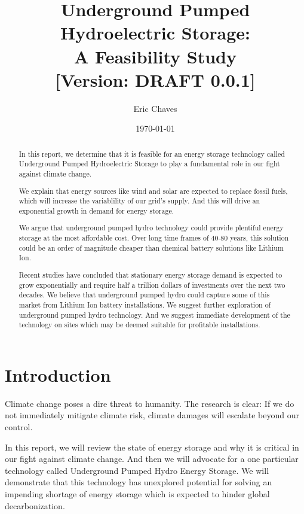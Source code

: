 \documentclass[hidelinks,12pt,a4paper]{article}
\title{%
  \LARGE Underground Pumped Hydroelectric Storage:\\
  \LARGE A Feasibility Study\\
  \bigskip
  \normalsize [Version: DRAFT 0.0.1]
}
\author{\large Eric Chaves}
\date{\large \today}
\begin{document}
\maketitle
\setlength{\parindent}{1em}
\setlength{\parskip}{1em}


\renewcommand{\abstractname}{Abstract}
\begin{abstract}
In this report, we determine that it is feasible for an energy storage technology called Underground Pumped Hydroelectric Storage to play a fundamental role in our fight against climate change.

We explain that energy sources like wind and solar are expected to replace fossil fuels, which will increase the variablility of our grid's supply. And this will drive an exponential growth in demand for energy storage.

We argue that underground pumped hydro technology could provide plentiful energy storage at the most affordable cost. Over long time frames of 40-80 years, this solution could be an order of magnitude cheaper than chemical battery solutions like Lithium Ion.

Recent studies have concluded that stationary energy storage demand is expected to grow exponentially and require half a trillion dollars of investments over the next two decades. We believe that underground pumped hydro could capture some of this market from Lithium Ion battery installations. We suggest further exploration of underground pumped hydro technology. And we suggest immediate development of the technology on sites which may be deemed suitable for profitable installations.

\end{abstract}

\pagebreak[1]

\renewcommand{\baselinestretch}{0.75}\normalsize
{\footnotesize
  \tableofcontents
}
\renewcommand{\baselinestretch}{1.5}\normalsize

\pagebreak[4]
\section{Introduction}
Climate change poses a dire threat to humanity. The research is clear: If we do not immediately mitigate climate risk, climate damages will escalate beyond our control.

In this report, we will review the state of energy storage and why it is critical in our fight against climate change. And then we will advocate for a one particular technology called Underground Pumped Hydro Energy Storage. We will demonstrate that this technology has unexplored potential for solving an impending shortage of energy storage which is expected to hinder global decarbonization.
\end{document}
